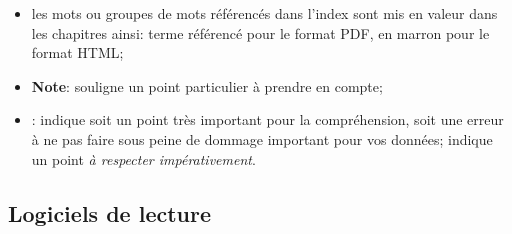 \begin{itemize}
	\item les mots ou groupes de mots référencés dans l'index sont mis en valeur dans les chapitres ainsi:
		\newline
		\hspace*{1.5cm}\textopenbullet{} \textsf{terme référencé} pour le format \gls{PDF},
		\newline
		\hspace*{1.5cm}\textopenbullet{} en marron pour le format \gls{HTML};
	\item \textbf{Note}: souligne un point particulier à prendre en compte;
	\item \textcolor{red}{}: indique soit un point très important pour la compréhension, soit une erreur à ne pas faire sous peine de dommage important pour vos données;\newline
	\textcolor{red}{} indique un point \emph{à respecter impérativement}.
\end{itemize} 



\subsection{Logiciels de lecture\label{introduction-manual-readers}}

